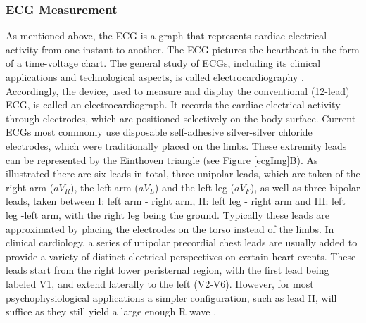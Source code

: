 
\subsubsection{ECG Measurement}

As mentioned above, the ECG is a graph that represents cardiac electrical activity from one instant to another. The ECG pictures the heartbeat in the form of a time-voltage chart. The general study of ECGs, including its clinical applications and technological aspects, is called electrocardiography \cite{GOLDBERGER2017}. Accordingly, the device, used to measure and display the conventional (12-lead) ECG, is called an electrocardiograph. It records the cardiac electrical activity through electrodes, which are positioned selectively on the body surface. Current ECGs most commonly use disposable self-adhesive silver-silver chloride electrodes, which were traditionally placed on the limbs. These extremity leads can be represented by the Einthoven triangle (see Figure \ref{ecgImg}B). As illustrated there are six leads in total, three unipolar leads, which are taken of the right arm ($aV_{R}$), the left arm ($aV_{L}$) and the left leg ($aV_{F}$), as well as three bipolar leads, taken between I: left arm - right arm, II: left leg - right arm and III: left leg -left arm, with the right leg being the ground. Typically these leads are approximated by placing the electrodes on the torso instead of the limbs. In clinical cardiology, a series of unipolar precordial chest leads are usually added to provide a variety of distinct electrical perspectives on certain heart events. These leads start from the right lower peristernal region, with the first lead being labeled V1, and extend laterally to the left (V2-V6). However, for most psychophysiological applications a simpler configuration, such as lead II, will suffice as they still yield a large enough R wave \citep{HANDBOOKPP}. 

